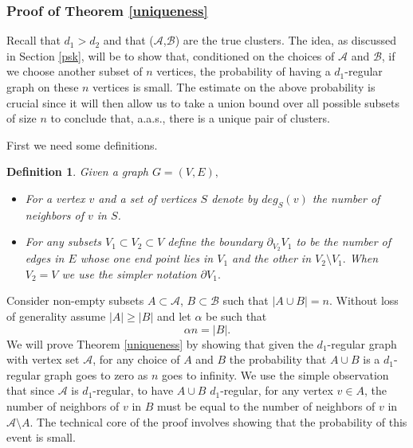 \documentclass[11pt,reqno]{amsart}
\newtheorem{definition}{Definition}
\begin{document}
\subsubsection{Proof of Theorem \ref{uniqueness}}\label{pou}

Recall that $d_1>d_2$ and that ($\mathcal{A}$,$\mathcal{B}$) are the true clusters. The idea, as discussed in Section \ref{psk}, will be to show that, conditioned on the choices of $\mathcal{A}$ and $\mathcal{B}$, if we choose another subset of $n$ vertices, the probability of having a $d_1$-regular graph on these $n$ vertices is small. The estimate on the above probability is crucial since it will then allow us to take a union bound over all possible subsets of size $n$ to conclude that, a.a.s., there is a unique pair of clusters.

First we need some definitions.
\begin{definition}\label{bdrydef}Given a graph $G=(V,E),$
\begin{itemize}
\item [i.]
For a vertex $v$ and a set of vertices $S$ denote by $deg_S(v)$ the number of neighbors of $v$ in $S$. 
\item [ii.]
For any subsets $V_1\subset V_2 \subset V$ define the boundary $\partial_{V_2}V_1$ to be the number of edges in $E$ whose one end point lies in $V_1$ and the other in $V_2\setminus V_1.$ 
When $V_2=V$  we use the simpler notation $\partial V_1.$
\end{itemize}
\end{definition}

Consider non-empty subsets $A\subset \mathcal{A}$, $B\subset \mathcal{B}$ such that $|A\cup B|=n$. Without loss of generality assume $|A|\ge|B|$ and let $\alpha$ be such that 
\begin{equation}\label{frac1}
\alpha n=|B|.
\end{equation}
 We will prove Theorem \ref{uniqueness} by showing that given the $d_1$-regular graph with vertex set $\mathcal{A}$, for any choice of $A$ and $B$ the probability that $A\cup B$ is a $d_1$-regular graph goes to zero as $n$ goes to infinity. We use the simple observation that since $\mathcal{A}$ is $d_1$-regular, to have $A\cup B$ $d_1$-regular, for any vertex $v \in A$, the number of neighbors of $v$ in $B$ must be equal to the number of neighbors of $v$ in $\mathcal{A}\setminus A.$ The technical core of the proof involves showing that the probability of this event is small.
 
\end{document}
